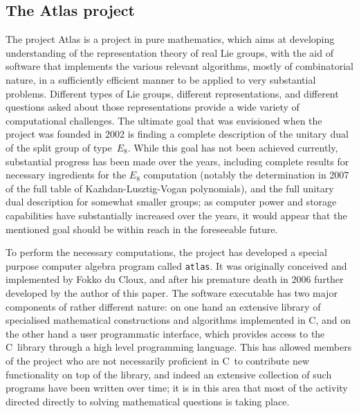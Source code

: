 \documentclass[12pt]{article}
\theoremstyle{plain}
\theoremstyle{definition}
\def\PP{\copy\PPbox}
\newcommand\Cee{\textsc{C}}
\newcommand\Cpp{\Cee\PP}
\begin{document}
\subsection{The Atlas project}

The project Atlas is a project in pure mathematics, which aims at developing
understanding of the representation theory of real Lie groups, with the aid of
software that implements the various relevant algorithms, mostly of
combinatorial nature, in a sufficiently efficient manner to be applied to very
substantial problems. Different types of Lie groups, different representations,
and different questions asked about those representations provide a wide variety
of computational challenges. The ultimate goal that was envisioned when the
project was founded in 2002 is finding a complete description of the unitary
dual of the split group of type~$E_8$. While this goal has not been achieved
currently, substantial progress has been made over the years, including complete
results for necessary ingredients for the $E_8$ computation (notably the
determination in 2007 of the full table of Kazhdan-Lusztig-Vogan polynomials),
and the full unitary dual description for somewhat smaller groups; as computer
power and storage capabilities have substantially increased over the years, it
would appear that the mentioned goal should be within reach in the foreseeable
future.

To perform the necessary computations, the project has developed a special
purpose computer algebra program called \texttt{atlas}. It was originally
conceived and implemented by Fokko du Cloux, and after his premature death in
2006 further developed by the author of this paper. The software executable has
two major components of rather different nature: on one hand an extensive
library of specialised mathematical constructions and algorithms implemented in
\Cpp, and on the other hand a user programmatic interface, which provides access
to the \Cpp\ library through a high level programming language. This has allowed
members of the project who are not necessarily proficient in \Cpp\ to contribute
new functionality on top of the library, and indeed an extensive collection of
such programs have been written over time; it is in this area that most of the
activity directed directly to solving mathematical questions is taking place.
\end{document}
